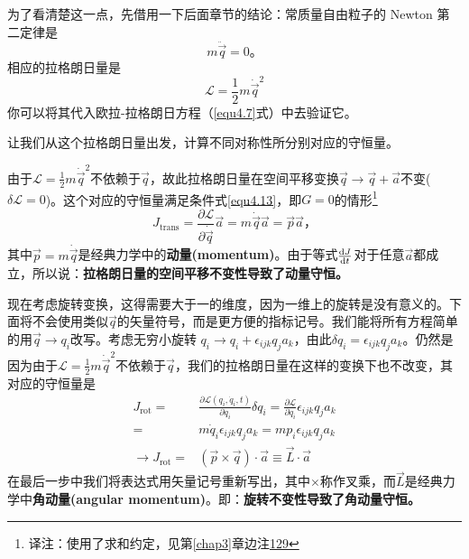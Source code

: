 为了看清楚这一点，先借用一下后面章节的结论：常质量自由粒子的 Newton 第二定律是%
\begin{equation}
m{\ddot{\vec{q}}} = 0 \text{。}
\end{equation}
相应的拉格朗日量是%
\begin{equation}
{\mathcal L}=\frac{1}{2}m\dot\vec{q}^2
\end{equation}
你可以将其代入欧拉-拉格朗日方程（\eqref{equ4.7}式）中去验证它。

让我们从这个拉格朗日量出发，计算不同对称性所分别对应的守恒量。

由于${\mathcal L}=\frac{1}{2}m{\dot\vec q}^2$不依赖于$\vec q$，故此拉格朗日量在空间平移变换$\vec{q}\rightarrow\vec{q}+\vec{a}$不变($\delta{\mathcal L}=0$)。这个对应的守恒量满足条件式\eqref{equ4.13}，即$G=0$的情形\footnote{译注：使用了求和约定，见第\ref{chap3}章边注\hyperref[sidenote.3.129]{129}}
\begin{equation}
J_\text{trans} = \frac{\partial\mathcal L}{\partial \dot{\vec q}} \vec a = m {\dot{\vec q}} {\vec a} = \vec{p}\vec{a} \text{，}
\end{equation}
其中$\vec{p}=m{\dot{\vec q}}$是经典力学中的{\bf 动量(momentum)}。由于等式$\frac{\mathrm d J}{\mathrm d t}$对于任意$\vec a$都成立，所以说：{\bf 拉格朗日量的空间平移不变性导致了动量守恒。}

现在考虑旋转变换，这得需要大于一的维度，因为一维上的旋转是没有意义的。下面将不会使用类似$\vec q$的矢量符号，而是更方便的指标记号。我们能将所有方程简单的用$\vec{q}\rightarrow q_i$改写。考虑无穷小旋转%
%
$q_i \rightarrow q_i + \epsilon_{ijk} q_j a_k$，由此$\delta q_i=\epsilon_{ijk}q_j a_k$。仍然是因为由于${\mathcal L}=\frac{1}{2}m{\dot\vec q}^2$不依赖于$\vec q$，我们的拉格朗日量在这样的变换下也不改变，其对应的守恒量是%
\begin{equation}
\begin{aligned}
J_\text{rot} =& \frac{\partial {\mathcal L}(q_i, \dot q_i, t)}{\partial \dot q_i}\delta q_i  = \frac{\partial \mathcal L}{\partial \dot q_i} \epsilon_{ijk} q_j a_k \\
  =& m {\dot q_i} \epsilon_{ijk} q_j a_k = m p_i\epsilon_{ijk} q_j a_k \\
  \rightarrow J_\text{rot} =& (\vec{p}\times\vec{q})\cdot\vec{a} \equiv \vec{L}\cdot\vec{a}
\end{aligned}
\end{equation}
在最后一步中我们将表达式用矢量记号重新写出，其中$\times$称作叉乘，而$\vec L$是经典力学中{\bf 角动量(angular momentum)}。即：{\bf 旋转不变性导致了角动量守恒。}

